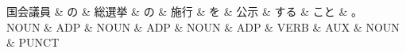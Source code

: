 \documentclass[tikz,border=5pt]{standalone}
\begin{document}
\normalsize
\begin{dependency}[edge unit distance=12.0pt]
    \begin{deptext}[column sep=1em]
        国会議員 \& の \& 総選挙 \& の \& 施行 \& を \& 公示 \& する \& こと \& 。\\
        NOUN \& ADP \& NOUN \& ADP \& NOUN \& ADP \& VERB \& AUX \& NOUN \& PUNCT\\
    \end{deptext}
\end{dependency}
\end{document}
